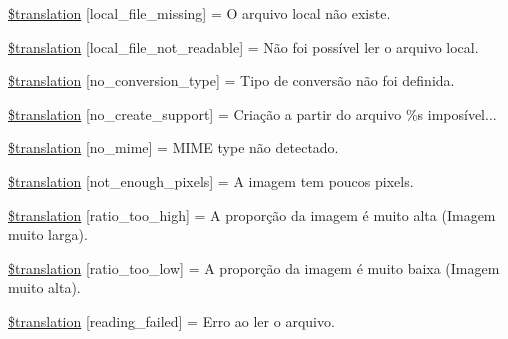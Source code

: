 \begin{DoxyCompactItemize}
\item 
\hyperlink{class_8upload_8pt___b_r_8php_a6ec3d3a47ab70d77e7aa593e82ead10e}{\$translation} \mbox{[}\textquotesingle{}local\+\_\+file\+\_\+missing\textquotesingle{}\mbox{]} = \textquotesingle{}O arquivo local não existe.\textquotesingle{}
\item 
\hyperlink{class_8upload_8pt___b_r_8php_a60104befef9b241f3a7a6a755618a4b3}{\$translation} \mbox{[}\textquotesingle{}local\+\_\+file\+\_\+not\+\_\+readable\textquotesingle{}\mbox{]} = \textquotesingle{}Não foi possível ler o arquivo local.\textquotesingle{}
\item 
\hyperlink{class_8upload_8pt___b_r_8php_a4712d7ec28e9a7f17eb3338af2358363}{\$translation} \mbox{[}\textquotesingle{}no\+\_\+conversion\+\_\+type\textquotesingle{}\mbox{]} = \textquotesingle{}Tipo de conversão não foi definida.\textquotesingle{}
\item 
\hyperlink{class_8upload_8pt___b_r_8php_a346dfd1ade29f583dd20d345c436859f}{\$translation} \mbox{[}\textquotesingle{}no\+\_\+create\+\_\+support\textquotesingle{}\mbox{]} = \textquotesingle{}Criação a partir do arquivo \%s imposível...\textquotesingle{}
\item 
\hyperlink{class_8upload_8pt___b_r_8php_a191a55df8e3bb7f3c51b70f3c1932e02}{\$translation} \mbox{[}\textquotesingle{}no\+\_\+mime\textquotesingle{}\mbox{]} = \textquotesingle{}M\+I\+M\+E type não detectado.\textquotesingle{}
\item 
\hyperlink{class_8upload_8pt___b_r_8php_a1fe342c27ce61f4ff4e0120ba647033e}{\$translation} \mbox{[}\textquotesingle{}not\+\_\+enough\+\_\+pixels\textquotesingle{}\mbox{]} = \textquotesingle{}A imagem tem poucos pixels.\textquotesingle{}
\item 
\hyperlink{class_8upload_8pt___b_r_8php_a23396f6ce7f31e5e5f1b57580621d982}{\$translation} \mbox{[}\textquotesingle{}ratio\+\_\+too\+\_\+high\textquotesingle{}\mbox{]} = \textquotesingle{}A proporção da imagem é muito alta (Imagem muito larga).\textquotesingle{}
\item 
\hyperlink{class_8upload_8pt___b_r_8php_ac533b9a479f056b0b8623e4268f068c2}{\$translation} \mbox{[}\textquotesingle{}ratio\+\_\+too\+\_\+low\textquotesingle{}\mbox{]} = \textquotesingle{}A proporção da imagem é muito baixa (Imagem muito alta).\textquotesingle{}
\item 
\hyperlink{class_8upload_8pt___b_r_8php_a01bea14c9fd5f353f62db44beabfcd42}{\$translation} \mbox{[}\textquotesingle{}reading\+\_\+failed\textquotesingle{}\mbox{]} = \textquotesingle{}Erro ao ler o arquivo.\textquotesingle{}

\end{DoxyCompactItemize}
